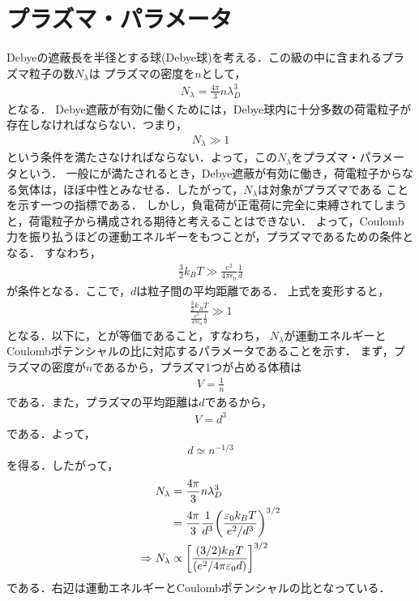 \documentclass{report}
\begin{document}
    \section{プラズマ・パラメータ}
Debyeの遮蔽長を半径とする球(Debye球)を考える．この級の中に含まれるプラズマ粒子の数$N_\lambda$は
プラズマの密度を$n$として，
\begin{align}
  N_\lambda = \frac{4\pi}{3}n \lambda_D^3
\end{align}
となる．
Debye遮蔽が有効に働くためには，Debye球内に十分多数の荷電粒子が存在しなければならない．つまり，
\begin{align}
  N_\lambda \gg 1 \label{plasma-parameter}
\end{align}
という条件を満たさなければならない．よって，この$N_\lambda$をプラズマ・パラメータという．
一般にが満たされるとき，Debye遮蔽が有効に働き，荷電粒子からなる気体は，ほぼ中性とみなせる．したがって，$N_\lambda$は対象がプラズマである
ことを示す一つの指標である．
しかし，負電荷が正電荷に完全に束縛されてしまうと，荷電粒子から構成される期待と考えることはできない．
よって，Coulomb力を振り払うほどの運動エネルギーをもつことが，プラズマであるための条件となる．
すなわち，
\begin{align}
  \frac{3}{2}k_B T \gg \frac{e^2}{4\pi\epsilon_0}\frac{1}{d}
\end{align}
が条件となる．ここで，$d$は粒子間の平均距離である．
上式を変形すると，
\begin{align}
  \frac{\frac{3}{2}k_B T}{\frac{e^2}{4\pi\epsilon_0}\frac{1}{d}} \gg 1 \label{plasma-parameter2}
\end{align}
となる．以下に，とが等価であること，すなわち，
$N_\lambda$が運動エネルギーとCoulombポテンシャルの比に対応するパラメータであることを示す．
まず，プラズマの密度が$n$であるから，プラズマ1つが占める体積は
\begin{align}
  V = \frac{1}{n}
\end{align}
である．また，プラズマの平均距離は$d$であるから，
\begin{align}
  V = d^3
\end{align}
である．よって，
\begin{align}
  d \simeq n^{-1/3}
\end{align}
を得る．したがって，
\begin{align}
  N_\lambda &= \frac{4\pi}{3}n \lambda_D^3\\
  &= \frac{4\pi}{3}\frac{1}{d^3}\qty(\frac{\varepsilon_0 k_B T}{e^2/d^3})^{3/2}\\
  \Rightarrow N_\lambda &\propto \qty[\frac{(3/2)k_B T}{(e^2/4\pi\varepsilon_0 d)}]^{3/2}
\end{align}
である．右辺は運動エネルギーとCoulombポテンシャルの比となっている．
\end{document}
